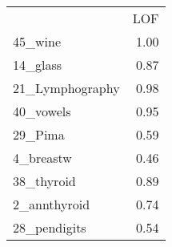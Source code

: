 \begin{tabular}{lr}
 & LOF \\
45_wine & 1.00 \\
14_glass & 0.87 \\
21_Lymphography & 0.98 \\
40_vowels & 0.95 \\
29_Pima & 0.59 \\
4_breastw & 0.46 \\
38_thyroid & 0.89 \\
2_annthyroid & 0.74 \\
28_pendigits & 0.54 \\
\end{tabular}
